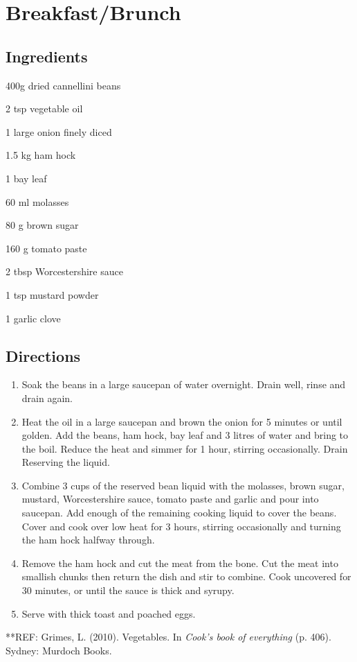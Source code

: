 \chapter{Breakfast/Brunch}
\section*{Ingredients}
\begin{ingredients-list}
	\item 400g dried cannellini beans
	\item 2 tsp vegetable oil
	\item 1 large onion finely diced
	\item 1.5 kg ham hock
	\item 1 bay leaf
	\item 60 ml molasses
	\item 80 g brown sugar
	\item 160 g tomato paste
	\item 2 tbsp Worcestershire sauce
	\item 1 tsp mustard powder
	\item 1 garlic clove 
\end{ingredients-list}

\section*{Directions}
\begin{enumerate}
	\item Soak the beans in a large saucepan of water overnight. Drain well, rinse and drain again.
	\item Heat the oil in a large saucepan and brown the onion for 5 minutes or until golden. Add the beans, ham hock, bay leaf and 3 litres of water and bring to the boil.
		Reduce the heat and simmer for 1 hour, stirring occasionally.  Drain Reserving the liquid.
	\item Combine 3 cups of the reserved bean liquid with the molasses, brown sugar, mustard, Worcestershire sauce, tomato paste and garlic and pour into saucepan.
		Add enough of the remaining cooking liquid to cover the beans. Cover and cook over low heat for 3 hours, stirring occasionally and turning the ham hock halfway through.
	\item Remove the ham hock and cut the meat from the bone. Cut the meat into smallish chunks then return the dish and stir to combine.
		Cook uncovered for 30 minutes, or until the sauce is thick and syrupy.
	\item Serve with thick toast and poached eggs.
\end{enumerate}
**REF: Grimes, L. (2010). Vegetables. In \textit{Cook's book of everything} (p. 406). Sydney: Murdoch Books.


